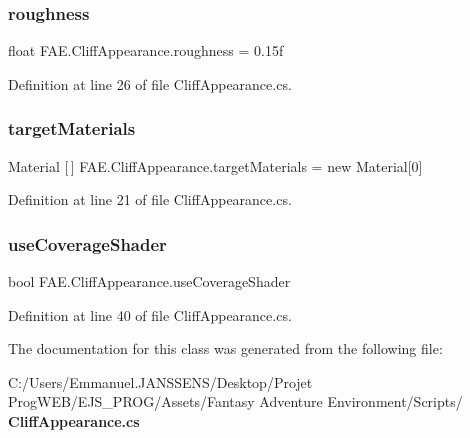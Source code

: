 \subsubsection{roughness}
{\footnotesize\ttfamily float F\+A\+E.\+Cliff\+Appearance.\+roughness = 0.\+15f}



Definition at line 26 of file Cliff\+Appearance.\+cs.

\mbox{\label{class_f_a_e_1_1_cliff_appearance_a5c2d6dff237480ea1c22a825b228dccd}} 
\subsubsection{target\+Materials}
{\footnotesize\ttfamily Material [$\,$] F\+A\+E.\+Cliff\+Appearance.\+target\+Materials = new Material[0]}



Definition at line 21 of file Cliff\+Appearance.\+cs.

\mbox{\label{class_f_a_e_1_1_cliff_appearance_ad3f985b99d210036cfc4b7a14e890e62}} 
\subsubsection{use\+Coverage\+Shader}
{\footnotesize\ttfamily bool F\+A\+E.\+Cliff\+Appearance.\+use\+Coverage\+Shader}



Definition at line 40 of file Cliff\+Appearance.\+cs.



The documentation for this class was generated from the following file\+:\begin{DoxyCompactItemize}
\item 
C\+:/\+Users/\+Emmanuel.\+J\+A\+N\+S\+S\+E\+N\+S/\+Desktop/\+Projet Prog\+W\+E\+B/\+E\+J\+S\+\_\+\+P\+R\+O\+G/\+Assets/\+Fantasy Adventure Environment/\+Scripts/\textbf{ Cliff\+Appearance.\+cs}\end{DoxyCompactItemize}
